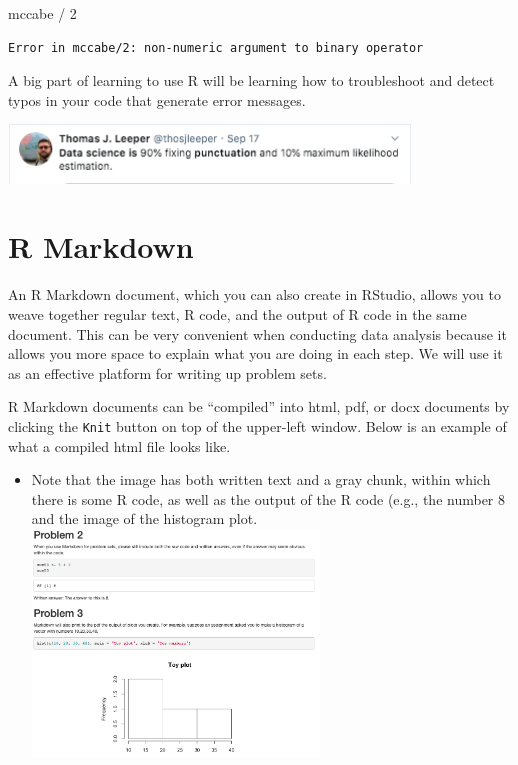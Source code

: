 \documentclass[
  letterpaper,
  DIV=11,
  numbers=noendperiod]{scrreprt}
\newenvironment{Shaded}{\begin{snugshade}}{\end{snugshade}}
\newcommand{\DecValTok}[1]{\textcolor[rgb]{0.68,0.00,0.00}{#1}}
\newcommand{\NormalTok}[1]{\textcolor[rgb]{0.00,0.23,0.31}{#1}}
\newcommand{\SpecialCharTok}[1]{\textcolor[rgb]{0.37,0.37,0.37}{#1}}
\providecommand{\tightlist}{%
  \setlength{\itemsep}{0pt}\setlength{\parskip}{0pt}}\usepackage{longtable,booktabs,array}
\begin{document}
\begin{Shaded}
\begin{Highlighting}[]
\NormalTok{mccabe }\SpecialCharTok{/} \DecValTok{2}
\end{Highlighting}
\end{Shaded}

\begin{verbatim}
Error in mccabe/2: non-numeric argument to binary operator
\end{verbatim}

A big part of learning to use R will be learning how to troubleshoot and
detect typos in your code that generate error messages.

\includegraphics[width=0.8\textwidth,height=\textheight]{images/punctuation.png}

\hypertarget{r-markdown}{%
\section{R Markdown}\label{r-markdown}}

An R Markdown document, which you can also create in RStudio, allows you
to weave together regular text, R code, and the output of R code in the
same document. This can be very convenient when conducting data analysis
because it allows you more space to explain what you are doing in each
step. We will use it as an effective platform for writing up problem
sets.

R Markdown documents can be ``compiled'' into html, pdf, or docx
documents by clicking the \texttt{Knit} button on top of the upper-left
window. Below is an example of what a compiled html file looks like.

\begin{itemize}
\tightlist
\item
  Note that the image has both written text and a gray chunk, within
  which there is some R code, as well as the output of the R code (e.g.,
  the number 8 and the image of the histogram plot.
  \includegraphics[width=0.6\textwidth,height=\textheight]{images/rmarkdownscreenshot.png}
\end{itemize}
\end{document}
